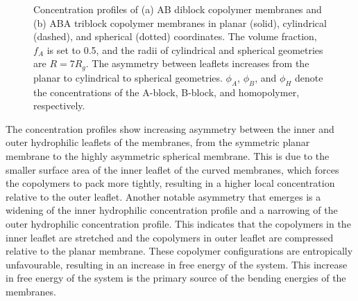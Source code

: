 \documentclass[twocolumn,aps,floatfix,nobibnotes]{revtex4-1}
\begin{document}
\begin{figure}[htp]
   
\caption[Two concentration profiles]{Concentration profiles of (a) AB diblock copolymer membranes and (b) ABA triblock copolymer membranes in planar (solid), cylindrical (dashed), and spherical (dotted) coordinates. The volume fraction, $f_A$ is set to 0.5, and the radii of cylindrical and spherical geometries are $R = 7R_g$. The asymmetry between leaflets increases from the planar to cylindrical to spherical geometries. $\phi_A$, $\phi_B$, and $\phi_H$ denote the concentrations of the A-block, B-block, and homopolymer, respectively. }
\end{figure}

The concentration profiles show increasing asymmetry between the inner and outer hydrophilic leaflets of the membranes, from the symmetric planar membrane to the highly asymmetric spherical membrane. This is due to the smaller surface area of the inner leaflet of the curved membranes, which forces the copolymers to pack more tightly, resulting in a higher local concentration relative to the outer leaflet. Another notable asymmetry that emerges is a widening of the inner hydrophilic concentration profile and a narrowing of the outer hydrophilic concentration profile. This indicates that the copolymers in the inner leaflet are stretched and the copolymers in outer leaflet are compressed relative to the planar membrane. These copolymer configurations are entropically unfavourable, resulting in an increase in free energy of the system. This increase in free energy of the system is the primary source of the bending energies of the membranes.
\end{document}
